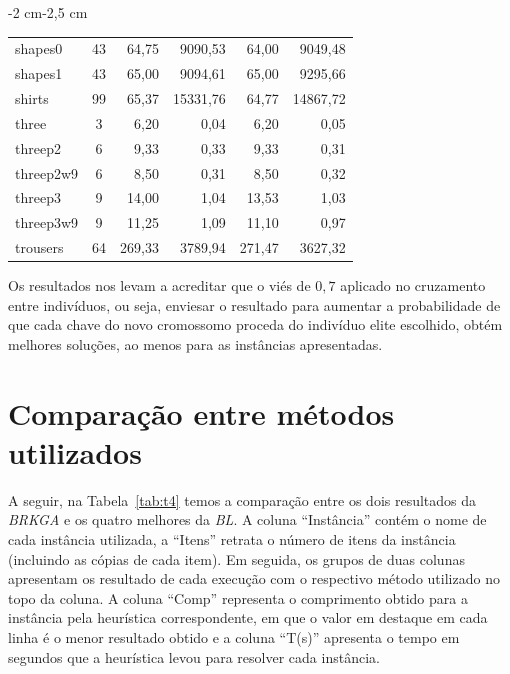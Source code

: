 \documentclass[12pt, openright, twoside, a4paper, english, brazilian]{USPSC-classe/USPSC}
\newcommand{\lgray}{\cellcolor{lightgray}}
\begin{document}
\begin{adjustwidth}{-2 cm}{-2,5 cm}
\begin{threeparttable}[!htb]
{\begin{tabular}{|l|c|rr|rr|}
        shapes0 &43 &64,75 &9090,53 &\lgray64,00 &9049,48 \\
        shapes1 &43 &\lgray65,00 &9094,61 &\lgray65,00 &9295,66 \\
        shirts &99 &65,37 &15331,76 &\lgray64,77 &14867,72 \\
        three &3 &\lgray6,20 &0,04 &\lgray6,20 &0,05 \\
        threep2 &6 &\lgray9,33 &0,33 &\lgray9,33 &0,31 \\
        threep2w9 &6 &\lgray8,50 &0,31 &\lgray8,50 &0,32 \\
        threep3 &9 &14,00 &1,04 &\lgray13,53 &1,03 \\
        threep3w9 &9 &11,25 &1,09 &\lgray11,10 &0,97 \\
        trousers &64 &\lgray269,33 &3789,94 &271,47 &3627,32 \\
        \hline
        \end{tabular}
    }
    \label{tab:t3}
\end{threeparttable}\end{adjustwidth}


\vspace{15pt}


Os resultados nos levam a acreditar que o viés de $0,7$ aplicado no cruzamento entre indivíduos, ou seja, enviesar o resultado para aumentar a probabilidade de que cada chave do novo cromossomo proceda do indivíduo elite escolhido, obtém melhores soluções, ao menos para as instâncias apresentadas.


\section{Comparação entre métodos utilizados} \label{sec:comp}

A seguir, na Tabela~\ref{tab:t4} temos a comparação entre os dois resultados da {\it BRKGA} e os quatro melhores da {\it BL}. A coluna ``Instância'' contém o nome de cada instância utilizada, a ``Itens'' retrata o número de itens da instância (incluindo as cópias de cada item). Em seguida, os grupos de duas colunas apresentam os resultado de cada execução com o respectivo método utilizado no topo da coluna. A coluna ``Comp'' representa o comprimento obtido para a instância pela heurística correspondente, em que o valor em destaque em cada linha é o menor resultado obtido e a coluna ``T(s)'' apresenta o tempo em segundos que a heurística levou para resolver cada instância.

\end{document}
